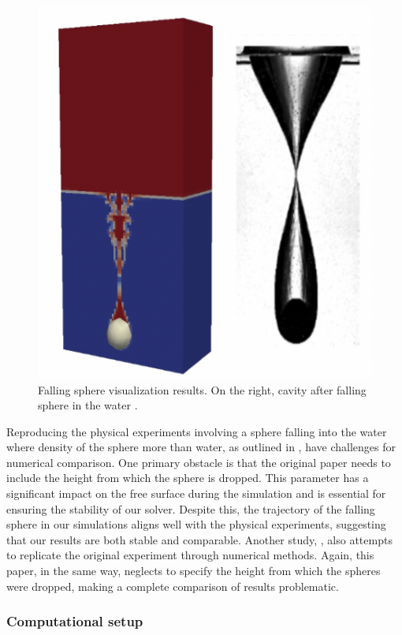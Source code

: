  \begin{figure}[!ht]
    \centering
    \includegraphics[width=12cm]{Images/chap3/cavityIB.png}
    \caption{Falling sphere visualization results. On the right, cavity after falling sphere in the water \cite{schwalbach}.}
    \label{fig:IB}
\end{figure}
Reproducing the physical experiments involving a sphere falling into the water where density of the sphere more than water, as outlined in \cite{schwalbach}, have challenges for numerical comparison. One primary obstacle is that the original paper needs to include the height from which the sphere is dropped. This parameter has a significant impact on the free surface during the simulation and is essential for ensuring the stability of our solver. Despite this, the trajectory of the falling sphere in our simulations aligns well with the physical experiments, suggesting that our results are both stable and comparable. Another study, \cite{shen2022resolved}, also attempts to replicate the original experiment through numerical methods. Again, this paper, in the same way, neglects to specify the height from which the spheres were dropped, making a complete comparison of results problematic.

\subsubsection{Computational setup}

